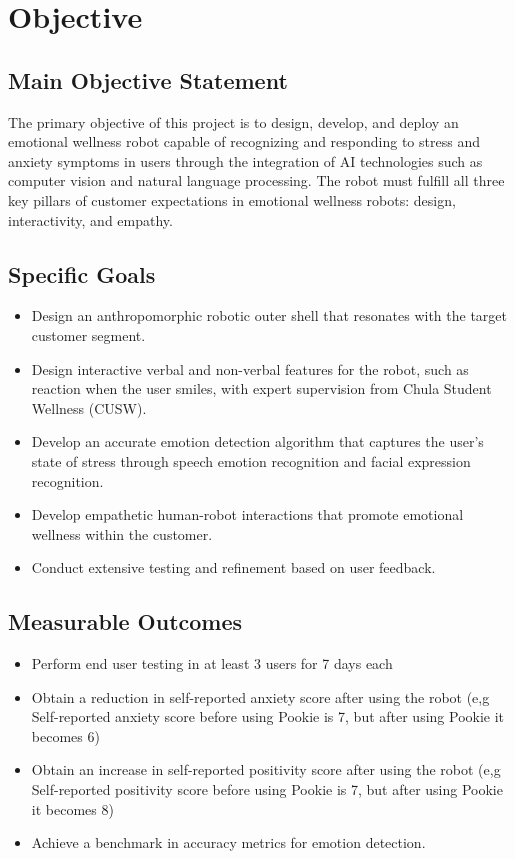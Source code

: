 \section{Objective}

\subsection{Main Objective Statement}
The primary objective of this project is to design, develop, and deploy an emotional wellness robot
capable of recognizing and responding to stress and anxiety symptoms in users through the integration of
AI technologies such as computer vision and natural language processing. The robot must fulfill all three
key pillars of customer expectations in emotional wellness robots: design, interactivity, and empathy.

\subsection{Specific Goals}
\begin{itemize}
    \item Design an anthropomorphic robotic outer shell that resonates with the target customer segment.
    \item Design interactive verbal and non-verbal features for the robot, such as reaction when the user smiles, with expert supervision from Chula Student Wellness (CUSW).
    \item Develop an accurate emotion detection algorithm that captures the user’s state of stress through speech emotion recognition and facial expression recognition.
    \item Develop empathetic human-robot interactions that promote emotional wellness within the customer.
    \item Conduct extensive testing and refinement based on user feedback.
\end{itemize}

\subsection{Measurable Outcomes}
\begin{itemize}
    \item Perform end user testing in at least 3 users for 7 days each
    \item Obtain a reduction in self-reported anxiety score after using the robot (e,g Self-reported anxiety score before using Pookie is 7, but after using Pookie it becomes 6)
    \item Obtain an increase in self-reported positivity score after using the robot (e,g Self-reported positivity score before using Pookie is 7, but after using Pookie it becomes 8)
    \item Achieve a benchmark in accuracy metrics for emotion detection.
\end{itemize}

